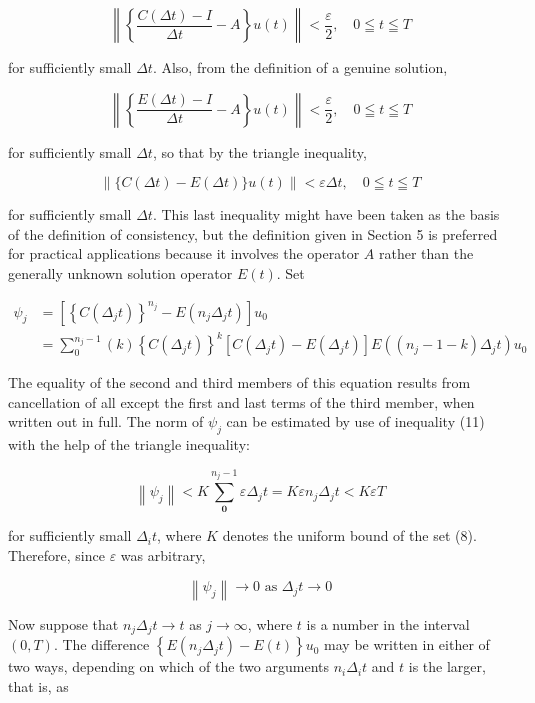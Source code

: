 \documentclass[10pt]{article}
\begin{document}
\[
\left\|\left\{\frac{C(\Delta t)-I}{\Delta t}-A\right\} u(t)\right\|<\frac{\varepsilon}{2}, \quad 0 \leqq t \leqq T
\]

for sufficiently small \(\Delta t\). Also, from the definition of a genuine solution,

\[
\left\|\left\{\frac{E(\Delta t)-I}{\Delta t}-A\right\} u(t)\right\|<\frac{\varepsilon}{2}, \quad 0 \leqq t \leqq T
\]

for sufficiently small \(\Delta t\), so that by the triangle inequality,

\[
\|\{C(\Delta t)-E(\Delta t)\} u(t)\|<\varepsilon \Delta t, \quad 0 \leqq t \leqq T
\]

for sufficiently small \(\Delta t\). This last inequality might have been taken as the basis of the definition of consistency, but the definition given in Section 5 is preferred for practical applications because it involves the operator \(A\) rather than the generally unknown solution operator \(E(t)\). Set

\[
\begin{aligned}
\psi_{j} & =\left[\left\{C\left(\Delta_{j} t\right)\right\}^{n_{j}}-E\left(n_{j} \Delta_{j} t\right)\right] u_{0} \\
& =\sum_{0}^{n_{j}-1}(k)\left\{C\left(\Delta_{j} t\right)\right\}^{k}\left[C\left(\Delta_{j} t\right)-E\left(\Delta_{j} t\right)\right] E\left(\left(n_{j}-1-k\right) \Delta_{j} t\right) u_{0}
\end{aligned}
\]

The equality of the second and third members of this equation results from cancellation of all except the first and last terms of the third member, when written out in full. The norm of \(\psi_{j}\) can be estimated by use of inequality (11) with the help of the triangle inequality:

\[
\left\|\psi_{j}\right\|<K \sum_{\mathbf{0}}^{n_{j}-1} \varepsilon \Delta_{j} t=K \varepsilon n_{j} \Delta_{j} t<K \varepsilon T
\]

for sufficiently small \(\Delta_{i} t\), where \(K\) denotes the uniform bound of the set (8). Therefore, since \(\varepsilon\) was arbitrary,

\[
\left\|\psi_{j}\right\| \rightarrow 0 \text { as } \Delta_{j} t \rightarrow 0
\]

Now suppose that \(n_{j} \Delta_{j} t \rightarrow t\) as \(j \rightarrow \infty\), where \(t\) is a number in the interval \((0, T)\). The difference \(\left\{E\left(n_{j} \Delta_{j} t\right)-E(t)\right\} u_{0}\) may be written in either of two ways, depending on which of the two arguments \(n_{i} \Delta_{i} t\) and \(t\) is the larger, that is, as
\end{document}
